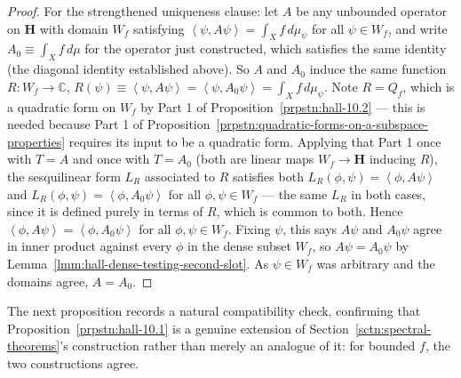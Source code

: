 \begin{proof}
For the strengthened uniqueness clause: let $A$ be any unbounded operator on $\mathbf{H}$ with domain $W_f$ satisfying $\left< \psi, A\psi \right> = \int_X f \, d\mu_\psi$ for all $\psi \in W_f$, and write $A_0 \equiv \int_X f \, d\mu$ for the operator just constructed, which satisfies the same identity (the diagonal identity established above). So $A$ and $A_0$ induce the same function $R : W_f \to \mathbb{C}$, $R(\psi) \equiv \left< \psi, A\psi \right> = \left< \psi, A_0\psi \right> = \int_X f\,d\mu_\psi$. Note $R = Q_f$, which is a quadratic form on $W_f$ by Part 1 of Proposition~\ref{prpstn:hall-10.2} — this is needed because Part 1 of Proposition~\ref{prpstn:quadratic-forms-on-a-subspace-properties} requires its input to be a quadratic form. Applying that Part 1 once with $T = A$ and once with $T = A_0$ (both are linear maps $W_f \to \mathbf{H}$ inducing $R$), the sesquilinear form $L_R$ associated to $R$ satisfies both $L_R(\phi,\psi) = \left< \phi, A\psi \right>$ and $L_R(\phi,\psi) = \left< \phi, A_0\psi \right>$ for all $\phi,\psi \in W_f$ — the same $L_R$ in both cases, since it is defined purely in terms of $R$, which is common to both. Hence $\left< \phi, A\psi \right> = \left< \phi, A_0\psi \right>$ for all $\phi, \psi \in W_f$. Fixing $\psi$, this says $A\psi$ and $A_0\psi$ agree in inner product against every $\phi$ in the dense subset $W_f$, so $A\psi = A_0\psi$ by Lemma~\ref{lmm:hall-dense-testing-second-slot}. As $\psi \in W_f$ was arbitrary and the domains agree, $A = A_0$.
\end{proof}

The next proposition records a natural compatibility check, confirming that Proposition~\ref{prpstn:hall-10.1} is a genuine extension of Section~\ref{sctn:spectral-theorems}'s construction rather than merely an analogue of it: for bounded $f$, the two constructions agree.

